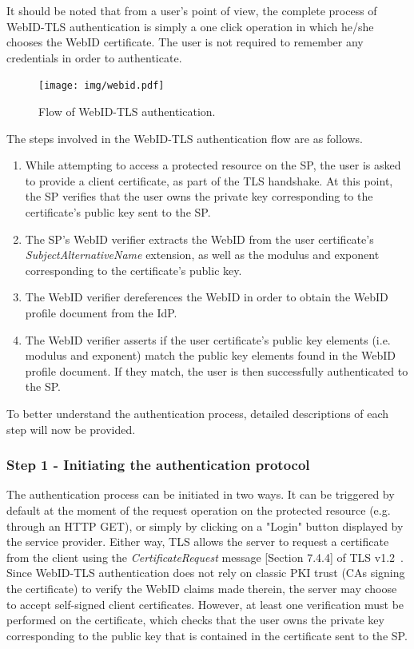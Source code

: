 It should be noted that from a user's point of view, the complete process of WebID-TLS authentication is simply a one click operation in which he/she chooses the WebID certificate. The user is not required to remember any credentials in order to authenticate.

\begin{figure}[h]
  \begin{center}
    \texttt{[image: img/webid.pdf]}
        \caption{Flow of WebID-TLS authentication.}
        \label{fig:webid-flow}
  \end{center}
\end{figure}

The steps involved in the WebID-TLS authentication flow are as follows.

\begin{enumerate}
\item While attempting to access a protected resource on the SP, the user is asked to provide a client certificate, as part of the TLS handshake. At this point, the SP verifies that the user owns the private key corresponding to the certificate's public key sent to the SP.
\item The SP's WebID verifier extracts the WebID from the user certificate's \textit{SubjectAlternativeName} extension, as well as the modulus and exponent corresponding to the certificate's public key.
\item The WebID verifier dereferences the WebID in order to obtain the WebID profile document from the IdP.
\item The WebID verifier asserts if the user certificate's public key elements (i.e. modulus and exponent) match the public key elements found in the WebID profile document. If they match, the user is then successfully authenticated to the SP.
\end{enumerate}

To better understand the authentication process, detailed descriptions of each step will now be provided.

\subsubsection{Step 1 - Initiating the authentication protocol}
The authentication process can be initiated in two ways. It can be triggered by default at the moment of the request operation on the protected resource (e.g. through an HTTP GET), or simply by clicking on a "Login" button displayed by the service provider. Either way, TLS allows the server to request a certificate from the client using the \textit{CertificateRequest} message [Section 7.4.4] of TLS v1.2~\cite{dierks2008transport}. Since WebID-TLS authentication does not rely on classic PKI trust (CAs signing the certificate) to verify the WebID claims made therein, the server may choose to accept self-signed client certificates. However, at least one verification must be performed on the certificate, which checks that the user owns the private key corresponding to the public key that is contained in the certificate sent to the SP.


